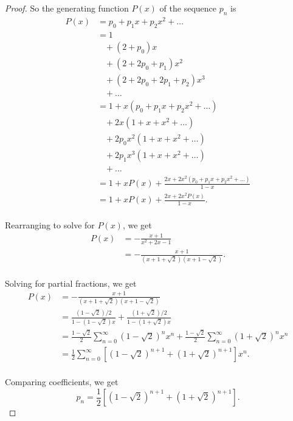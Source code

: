 \documentclass{article}
\begin{document}
\begin{enumerate}[label={\bf Q\arabic*:}]
\begin{proof}
      So the generating function $P(x)$ of the sequence $p_n$ is
      \begin{align*}
        P(x) &=p_0 +p_1x +p_2x^2+\ldots\\
          &=1\\
          &\;\;\;+(2+p_0)x\\
          &\;\;\;+(2+2p_0+p_1)x^2\\
          &\;\;\;+(2+2p_0+2p_1+p_2)x^3\\
          &\;\;\;+\ldots\\
        &=1+x(p_0+p_1x+p_2x^2+\ldots)\\
          &\;\;\;+2x(1+x+x^2+\ldots)\\
          &\;\;\;+2p_0x^2(1+x+x^2+\ldots)\\
          &\;\;\;+2p_1x^3(1+x+x^2+\ldots)\\
          &\;\;\;+\ldots\\
        &=1+xP(x) +\frac{2x+2x^2(p_0+p_1x+p_2x^2+\ldots)}{1-x}\\
        &=1+xP(x) +\frac{2x+2x^2P(x)}{1-x}.\\
      \end{align*}

      Rearranging to solve for $P(x)$, we get
      \begin{align*}
        P(x) &=-\frac{x+1}{x^2+2x-1}\\
        &=-\frac{x+1}{(x+1+\sqrt{2})(x+1-\sqrt{2})}.\\
      \end{align*}

      Solving for partial fractions, we get
      \begin{align*}
        P(x) &=-\frac{x+1}{(x+1+\sqrt{2})(x+1-\sqrt{2})}\\
        &=\frac{(1-\sqrt{2})/2}{1-(1-\sqrt{2})x}
          +\frac{(1+\sqrt{2})/2}{1-(1+\sqrt{2})x}\\
        &=\frac{1-\sqrt{2}}{2} \sum_{n=0}^\infty
          \left(1-\sqrt{2}\right)^nx^n +\frac{1-\sqrt{2}}{2}
          \sum_{n=0}^\infty \left(1+\sqrt{2}\right)^nx^n\\
        &=\frac{1}{2} \sum_{n=0}^\infty \left[\left(1-\sqrt{2}\right)^{n+1}
        +\left(1+\sqrt{2}\right)^{n+1}\right] x^n.\\
      \end{align*}

      Comparing coefficients, we get
      \[p_n =\frac{1}{2} \left[\left(1-\sqrt{2}\right)^{n+1}
        +\left(1+\sqrt{2}\right)^{n+1}\right].\]
    \end{proof}


\end{enumerate}
\end{document}
